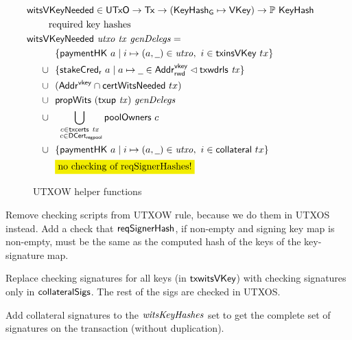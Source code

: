\begin{figure}[htb]
  \begin{align*}
    & \hspace{-0.8cm}\fun{witsVKeyNeeded} \in \UTxO \to \Tx \to (\KeyHashGen\mapsto\VKey) \to
      \powerset{\KeyHash} \\
    & \text{required key hashes} \\
    &  \hspace{-0.8cm}\fun{witsVKeyNeeded}~\var{utxo}~\var{tx}~\var{genDelegs} = \\
    & ~~\{ \fun{paymentHK}~a \mid i \mapsto (a, \wcard) \in \var{utxo},~i\in\fun{txinsVKey}~{tx} \} \\
    \cup & ~~
           \{\fun{stakeCred_r}~a\mid a\mapsto \wcard \in \AddrRWDVKey
      \restrictdom \txwdrls{tx}\}\\
    \cup & ~~(\AddrVKey \cap \fun{certWitsNeeded}~{tx}) \\
    \cup & ~~\fun{propWits}~(\fun{txup}~\var{tx})~\var{genDelegs} \\
    \cup & ~~\bigcup_{\substack{c \in \txcerts{tx} \\ ~c \in\DCertRegPool}} \fun{poolOwners}~{c} \\
    \cup & ~~{\{ \fun{paymentHK}~a \mid i \mapsto (a, \wcard) \in \var{utxo},~i\in\fun{collateral}~{tx} \}} \\
    & ~~\hldiff{\text{no checking of reqSignerHashes!}}
  \end{align*}
  \caption{UTXOW helper functions}
  \label{fig:functions-witnesses}
\end{figure}

Remove checking scripts from UTXOW rule, because we do them in UTXOS instead.
Add a check that $\mathsf{reqSignerHash}$, if non-empty and signing key map is non-empty,
must be the same as the computed hash of the keys of the key-signature map.

Replace checking signatures for all keys (in $\mathsf{txwitsVKey}$) with checking
signatures only in $\mathsf{collateralSigs}$. The rest of the sigs are checked in UTXOS.

Add collateral signatures to the $\mathit{witsKeyHashes}$ set to get the complete
set of signatures on the transaction (without duplication).

